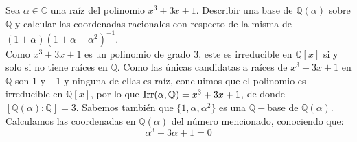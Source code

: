 \begin{ejercicio}
    Sea $\alpha\in \mathbb{C}$ una raíz del polinomio $x^3+3x+1$. Describir una base de $\mathbb{Q}(\alpha)$ sobre $\mathbb{Q}$ y calcular las coordenadas racionales con respecto de la misma de $(1+\alpha){(1+\alpha+\alpha^2)}^{-1}$.\\

    \noindent
    Como $x^3+3x+1$ es un polinomio de grado 3, este es irreducible en $\mathbb{Q}[x]$ si y solo si no tiene raíces en $\mathbb{Q}$. Como las únicas candidatas a raíces de $x^3+3x+1$ en $\mathbb{Q}$ son $1$ y $-1$ y ninguna de ellas es raíz, concluimos que el polinomio es irreducible en $\mathbb{Q}[x]$, por lo que $\operatorname{Irr}(\alpha,\mathbb{Q}) = x^3+3x+1$, de donde $[\mathbb{Q}(\alpha):\mathbb{Q}] = 3$. Sabemos también que $\{1,\alpha,\alpha^2\}$ es una $\mathbb{Q}-$base de $\mathbb{Q}(\alpha)$.\\

    \noindent
    Calculamos las coordenadas en $\mathbb{Q}(\alpha)$ del número mencionado, conociendo que:
    \begin{equation*}
        \alpha^3 + 3\alpha + 1 = 0
    \end{equation*} %
\end{ejercicio}


